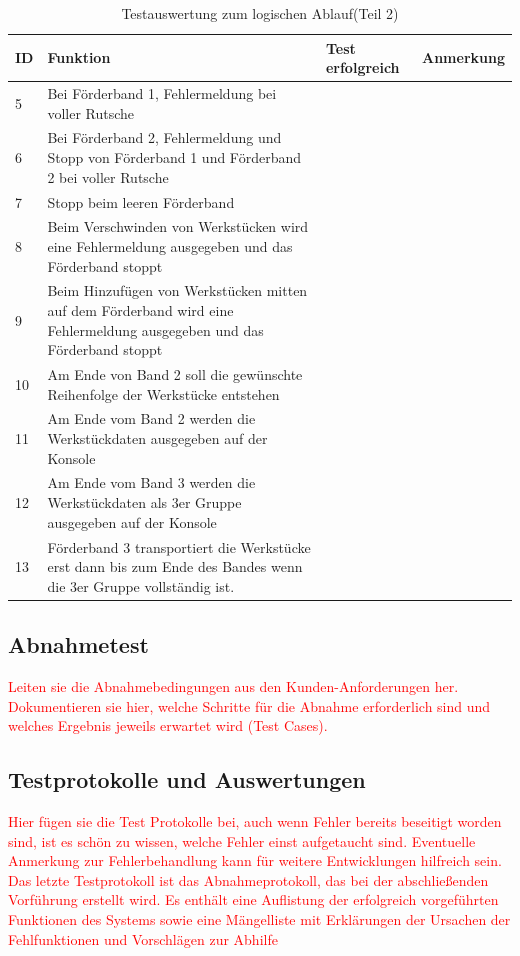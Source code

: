 \documentclass[a4paper, 11pt]{article}
\begin{document}
\newpage

\begin{table}[h]
\center
\begin{tabularx}{\textwidth}{|l|X|X|X|}
\hline
\textbf{ID}&\textbf{Funktion}&\textbf{Test erfolgreich}&\textbf{Anmerkung}\\
\hline
5&Bei Förderband 1, Fehlermeldung bei voller Rutsche&&\\
\hline
6&Bei Förderband 2, Fehlermeldung und Stopp von Förderband 1 und Förderband 2 bei voller Rutsche&&\\
\hline
7&Stopp beim leeren Förderband&&\\
\hline
8&Beim Verschwinden von Werkstücken wird eine Fehlermeldung ausgegeben und das Förderband stoppt&&\\
\hline
9&Beim Hinzufügen von Werkstücken mitten auf dem Förderband wird eine Fehlermeldung ausgegeben und das Förderband stoppt&&\\
\hline
10&Am Ende von Band 2 soll die gewünschte Reihenfolge der Werkstücke entstehen&&\\
\hline
11&Am Ende vom Band 2 werden die Werkstückdaten ausgegeben auf der Konsole&&\\
\hline
12&Am Ende vom Band 3 werden die Werkstückdaten als 3er Gruppe ausgegeben auf der Konsole&&\\
\hline
13&Förderband 3 transportiert die Werkstücke erst dann bis zum Ende des Bandes wenn die 3er Gruppe vollständig ist.&&\\
\hline
\end{tabularx}
\caption{Testauswertung zum logischen Ablauf(Teil 2)}
\label{tstl2}
\end{table}

\newpage

\subsection{Abnahmetest}
\textcolor{red}{Leiten sie die Abnahmebedingungen aus den Kunden-Anforderungen her. Dokumentieren sie hier, welche Schritte für die Abnahme erforderlich sind und welches Ergebnis jeweils erwartet wird (Test Cases).}

\subsection{Testprotokolle und Auswertungen}
\textcolor{red}{Hier fügen sie die Test Protokolle bei, auch wenn Fehler bereits beseitigt worden sind, ist es schön zu wissen, welche Fehler einst aufgetaucht sind. Eventuelle Anmerkung zur Fehlerbehandlung kann für weitere Entwicklungen hilfreich sein.
Das letzte Testprotokoll ist das Abnahmeprotokoll, das bei der abschließenden Vorführung erstellt wird. Es enthält eine Auflistung der erfolgreich vorgeführten Funktionen des Systems sowie eine Mängelliste mit Erklärungen der Ursachen der Fehlfunktionen und Vorschlägen zur Abhilfe
}
\end{document}
